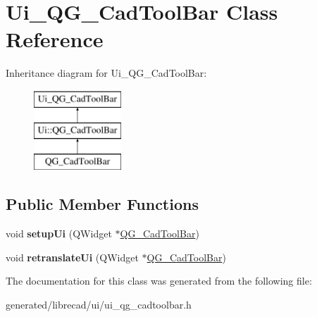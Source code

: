 \hypertarget{classUi__QG__CadToolBar}{\section{Ui\-\_\-\-Q\-G\-\_\-\-Cad\-Tool\-Bar Class Reference}
\label{classUi__QG__CadToolBar}
}
Inheritance diagram for Ui\-\_\-\-Q\-G\-\_\-\-Cad\-Tool\-Bar\-:\begin{figure}[H]
\begin{center}
\leavevmode
\includegraphics[height=3.000000cm]{classUi__QG__CadToolBar}
\end{center}
\end{figure}
\subsection*{Public Member Functions}
\begin{DoxyCompactItemize}
\item 
\hypertarget{classUi__QG__CadToolBar_a4ac481272e8e85b9ec5a495e08e378dc}{void {\bfseries setup\-Ui} (Q\-Widget $\ast$\hyperlink{classQG__CadToolBar}{Q\-G\-\_\-\-Cad\-Tool\-Bar})}\label{classUi__QG__CadToolBar_a4ac481272e8e85b9ec5a495e08e378dc}

\item 
\hypertarget{classUi__QG__CadToolBar_a9baaec55894bb4e8f85613e27b3d1754}{void {\bfseries retranslate\-Ui} (Q\-Widget $\ast$\hyperlink{classQG__CadToolBar}{Q\-G\-\_\-\-Cad\-Tool\-Bar})}\label{classUi__QG__CadToolBar_a9baaec55894bb4e8f85613e27b3d1754}

\end{DoxyCompactItemize}


The documentation for this class was generated from the following file\-:\begin{DoxyCompactItemize}
\item 
generated/librecad/ui/ui\-\_\-qg\-\_\-cadtoolbar.\-h\end{DoxyCompactItemize}
